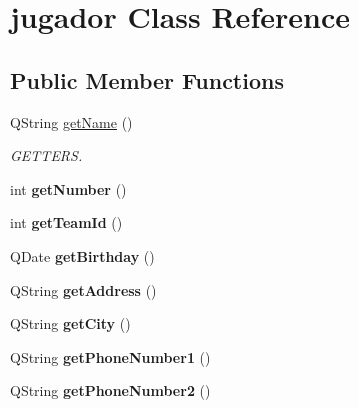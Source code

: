 \hypertarget{classjugador}{}\section{jugador Class Reference}
\label{classjugador}
\subsection*{Public Member Functions}
\begin{DoxyCompactItemize}
\item 
\mbox{\label{classjugador_adc3df126f15f2bb2aec01cc04145ae14}} 
Q\+String \mbox{\hyperlink{classjugador_adc3df126f15f2bb2aec01cc04145ae14}{get\+Name}} ()
\begin{DoxyCompactList}\small\item\em G\+E\+T\+T\+E\+RS. \end{DoxyCompactList}\item 
\mbox{\label{classjugador_ad1b16c02d5c0ec28e2a7db3ac0a09cda}} 
int {\bfseries get\+Number} ()
\item 
\mbox{\label{classjugador_a188b5459eed3f7f09b49232d0d674050}} 
int {\bfseries get\+Team\+Id} ()
\item 
\mbox{\label{classjugador_a845558cf9e7def7add1d73e9b6812865}} 
Q\+Date {\bfseries get\+Birthday} ()
\item 
\mbox{\label{classjugador_adb7342524d07d6708414942a82cfa514}} 
Q\+String {\bfseries get\+Address} ()
\item 
\mbox{\label{classjugador_a326f8dd3d47d3fa8fdb7b38b27c47bc8}} 
Q\+String {\bfseries get\+City} ()
\item 
\mbox{\label{classjugador_a9bf1e0a307861344a0912d21ec4bf5a9}} 
Q\+String {\bfseries get\+Phone\+Number1} ()
\item 
\mbox{\label{classjugador_aa6bbb640f9c687cebedcd442b96e5f76}} 
Q\+String {\bfseries get\+Phone\+Number2} ()
\item 
\mbox{\label{classjugador_a03b468db718824916d7f6d47e46e708b}} 

\end{DoxyCompactItemize}
